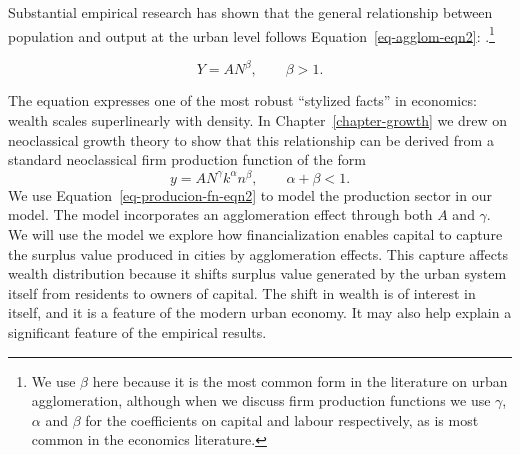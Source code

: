 





Substantial empirical research has shown that the general relationship between population and output at the urban level follows Equation~\ref{eq-agglom-eqn2}: \cite{loboUrbanScalingProduction2013}.\footnote{We use $\beta$ here because it is the most common form in the literature on urban agglomeration, although when we discuss firm production functions we use $\gamma$, $\alpha$ and $\beta$ for the coefficients on capital and labour respectively, as is most common in the economics literature.}

\begin{equation}\label{eq-agglom-eqn2}
    Y=AN^\beta,\qquad \beta>1. 
\end{equation}

 The equation expresses one of the most robust ``stylized facts'' in economics: wealth scales superlinearly with density.  In Chapter~\ref{chapter-growth} we drew on neoclassical growth theory to show that this relationship can be derived from a standard neoclassical firm production function of the form
\begin{equation}\label{eq-producion-fn-eqn2}
    y=AN^\gamma k^\alpha n^\beta,\qquad \alpha+\beta<1. 
\end{equation}
We use Equation~\ref{eq-producion-fn-eqn2} to model the production sector in our model. The model incorporates an agglomeration effect through both $A$ and $\gamma$. We will use the model we explore how financialization enables capital to capture the surplus value produced in cities by agglomeration effects. This capture affects wealth distribution because it shifts surplus value generated by the urban system itself from residents to owners of capital. The shift in wealth is of interest in itself, and it is a feature of the modern urban economy. It may also help explain a significant feature of the empirical results.

